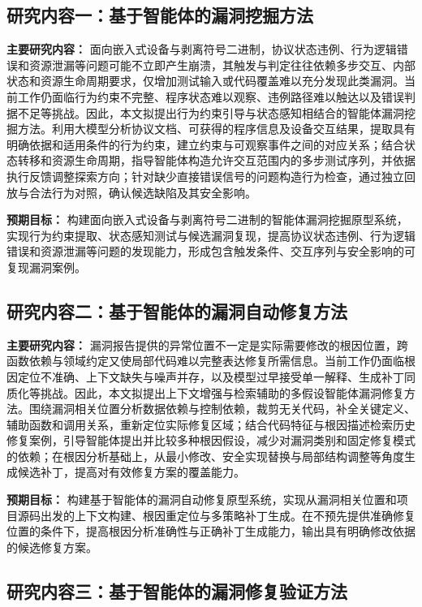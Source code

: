 \subsection{研究内容一：基于智能体的漏洞挖掘方法}
\label{sec:research-discovery}

\textbf{主要研究内容：}
面向嵌入式设备与剥离符号二进制，协议状态违例、行为逻辑错误和资源泄漏等问题可能不立即产生崩溃，其触发与判定往往依赖多步交互、内部状态和资源生命周期要求，仅增加测试输入或代码覆盖难以充分发现此类漏洞。当前工作仍面临行为约束不完整、程序状态难以观察、违例路径难以触达以及错误判据不足等挑战。因此，本文拟提出行为约束引导与状态感知相结合的智能体漏洞挖掘方法。利用大模型分析协议文档、可获得的程序信息及设备交互结果，提取具有明确依据和适用条件的行为约束，建立约束与可观察事件之间的对应关系；结合状态转移和资源生命周期，指导智能体构造允许交互范围内的多步测试序列，并依据执行反馈调整探索方向；针对缺少直接错误信号的问题构造行为检查，通过独立回放与合法行为对照，确认候选缺陷及其安全影响。

\textbf{预期目标：}
构建面向嵌入式设备与剥离符号二进制的智能体漏洞挖掘原型系统，实现行为约束提取、状态感知测试与候选漏洞复现，提高协议状态违例、行为逻辑错误和资源泄漏等问题的发现能力，形成包含触发条件、交互序列与安全影响的可复现漏洞案例。

\subsection{研究内容二：基于智能体的漏洞自动修复方法}
\label{sec:research-repair}

\textbf{主要研究内容：}
漏洞报告提供的异常位置不一定是实际需要修改的根因位置，跨函数依赖与领域约定又使局部代码难以完整表达修复所需信息。当前工作仍面临根因定位不准确、上下文缺失与噪声并存，以及模型过早接受单一解释、生成补丁同质化等挑战。因此，本文拟提出上下文增强与检索辅助的多假设智能体漏洞修复方法。围绕漏洞相关位置分析数据依赖与控制依赖，裁剪无关代码，补全关键定义、辅助函数和调用关系，重新定位实际修复区域；结合代码特征与根因描述检索历史修复案例，引导智能体提出并比较多种根因假设，减少对漏洞类别和固定修复模式的依赖；在根因分析基础上，从最小修改、安全实现替换与局部结构调整等角度生成候选补丁，提高对有效修复方案的覆盖能力。

\textbf{预期目标：}
构建基于智能体的漏洞自动修复原型系统，实现从漏洞相关位置和项目源码出发的上下文构建、根因重定位与多策略补丁生成。在不预先提供准确修复位置的条件下，提高根因分析准确性与正确补丁生成能力，输出具有明确修改依据的候选修复方案。

\subsection{研究内容三：基于智能体的漏洞修复验证方法}
\label{sec:research-verification}

